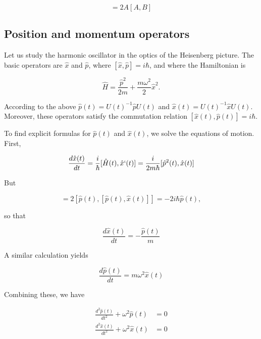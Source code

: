 \begin{equation}
[A^2, B] = 2A[A,B]
\end{equation}


\subsection{Position and momentum operators}

Let us study the harmonic oscillator in the optics of the Heisenberg picture.  The basic operators are $\hat x$ and $\hat p$, where $[\hat x, \hat p] = i\hbar$, and where the Hamiltonian is

\begin{equation}
\hat H = \frac{\hat p^2}{2m} + \frac{m \omega^2}{2} \hat x^2.
\end{equation}

According to the above $\hat p(t) = U(t)^{-1}\hat p U(t)$ and $\hat x(t) = U(t)^{-1}\hat x U(t)$.  Moreover, these operators satisfy the commutation relation $[\hat x(t), \hat p(t)] = i\hbar$.


To find explicit formulas for $\hat p(t)$ and $\hat x(t)$, we solve the equations of motion.  First,

\begin{equation}
\frac{d\hat x(t)}{dt} = \frac{i}{\hbar}[\hat H(t), \hat x`(t)] 
= \frac{i}{2m\hbar}[\hat p^2(t), \hat x(t)] 
\end{equation}

But 

\begin{equation}
[\hat p^2(t), \hat x(t)] = 2[\hat p(t), [\hat p(t), \hat x(t)]] = -2i\hbar \hat p(t),
\end{equation}

so that

\begin{equation}
\frac{d\hat x(t)}{dt} 
= -\frac{\hat p(t)}{m}
\end{equation}

A similar calculation yields

\begin{equation}
\frac{d\hat p(t)}{dt} = m\omega^2 \hat x(t)
\end{equation}

Combining these, we have

\begin{align}
\frac{d^2\hat p(t)}{dt^2} + \omega^2\hat p(t) & = 0 \\
\frac{d^2\hat x(t)}{dt^2} + \omega^2\hat x(t) & = 0
\end{align}

